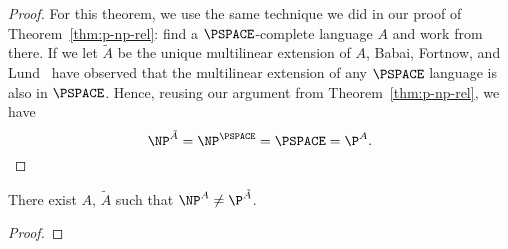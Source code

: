 \begin{proof}
  For this theorem, we use the same technique we did in our proof of
  Theorem~\ref{thm:p-np-rel}: find a $\PSPACE$-complete language $A$ and work
  from there. If we let $\tilde{A}$ be the unique multilinear extension of $A$,
  Babai, Fortnow, and Lund~\cite{BFL90} have observed that the multilinear
  extension of any $\PSPACE$ language is also in $\PSPACE$. Hence, reusing our
  argument from Theorem~\ref{thm:p-np-rel}, we have
  \begin{equation}
    \NP^{\tilde{A}} = \NP^{\PSPACE} = \PSPACE = \P^{A}.
  \end{equation}
\end{proof}

\begin{thm}[{\cite[Theorem 5.3]{AW09}}]\label{thm:p-np-nalg}
  There exist $A$, $\tilde{A}$ such that $\NP^{A} \ne \P^{\tilde{A}}$.
\end{thm}

\begin{proof}
\end{proof}

\printbibliography{}

\printindex{}


